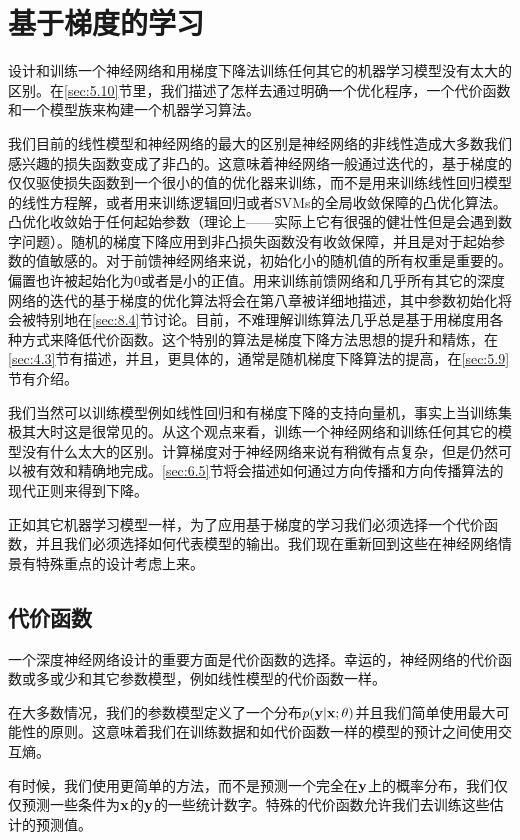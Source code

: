 \section{基于梯度的学习}
\label{sec:6.2}

设计和训练一个神经网络和用梯度下降法训练任何其它的机器学习模型没有太大的区别。在\ref{sec:5.10}节里，我们描述了怎样去通过明确一个优化程序，一个代价函数和一个模型族来构建一个机器学习算法。

我们目前的线性模型和神经网络的最大的区别是神经网络的非线性造成大多数我们感兴趣的损失函数变成了非凸的。这意味着神经网络一般通过迭代的，基于梯度的仅仅驱使损失函数到一个很小的值的优化器来训练，而不是用来训练线性回归模型的线性方程解，或者用来训练逻辑回归或者SVMs的全局收敛保障的凸优化算法。凸优化收敛始于任何起始参数（理论上——实际上它有很强的健壮性但是会遇到数字问题）。随机的梯度下降应用到非凸损失函数没有收敛保障，并且是对于起始参数的值敏感的。对于前馈神经网络来说，初始化小的随机值的所有权重是重要的。偏置也许被起始化为0或者是小的正值。用来训练前馈网络和几乎所有其它的深度网络的迭代的基于梯度的优化算法将会在第八章被详细地描述，其中参数初始化将会被特别地在\ref{sec:8.4}节讨论。目前，不难理解训练算法几乎总是基于用梯度用各种方式来降低代价函数。这个特别的算法是梯度下降方法思想的提升和精炼，在\ref{sec:4.3}节有描述，并且，更具体的，通常是随机梯度下降算法的提高，在\ref{sec:5.9}节有介绍。

我们当然可以训练模型例如线性回归和有梯度下降的支持向量机，事实上当训练集极其大时这是很常见的。从这个观点来看，训练一个神经网络和训练任何其它的模型没有什么太大的区别。计算梯度对于神经网络来说有稍微有点复杂，但是仍然可以被有效和精确地完成。\ref{sec:6.5}节将会描述如何通过方向传播和方向传播算法的现代正则来得到下降。

正如其它机器学习模型一样，为了应用基于梯度的学习我们必须选择一个代价函数，并且我们必须选择如何代表模型的输出。我们现在重新回到这些在神经网络情景有特殊重点的设计考虑上来。

\subsection{代价函数}
\label{sec:6.2.1}

一个深度神经网络设计的重要方面是代价函数的选择。幸运的，神经网络的代价函数或多或少和其它参数模型，例如线性模型的代价函数一样。

在大多数情况，我们的参数模型定义了一个分布$p(\bf{y}|\bf{x};\bf{\theta})$并且我们简单使用最大可能性的原则。这意味着我们在训练数据和如代价函数一样的模型的预计之间使用交互熵。

有时候，我们使用更简单的方法，而不是预测一个完全在$\bf{y}$上的概率分布，我们仅仅预测一些条件为$\bf{x}$的$\bf{y}$的一些统计数字。特殊的代价函数允许我们去训练这些估计的预测值。

